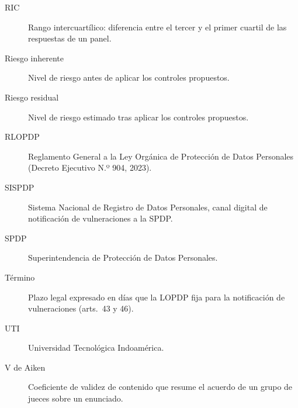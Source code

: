 \begin{description}
  \item[RIC] Rango intercuartílico: diferencia entre el tercer y el primer cuartil de las respuestas de un panel.
  \item[Riesgo inherente] Nivel de riesgo antes de aplicar los controles propuestos.
  \item[Riesgo residual] Nivel de riesgo estimado tras aplicar los controles propuestos.
  \item[RLOPDP] Reglamento General a la Ley Orgánica de Protección de Datos Personales (Decreto Ejecutivo N.º 904, 2023).
  \item[SISPDP] Sistema Nacional de Registro de Datos Personales, canal digital de notificación de vulneraciones a la SPDP.
  \item[SPDP] Superintendencia de Protección de Datos Personales.
  \item[Término] Plazo legal expresado en días que la LOPDP fija para la notificación de vulneraciones (arts.~43 y 46).
  \item[UTI] Universidad Tecnológica Indoamérica.
  \item[V de Aiken] Coeficiente de validez de contenido que resume el acuerdo de un grupo de jueces sobre un enunciado.
\end{description}
